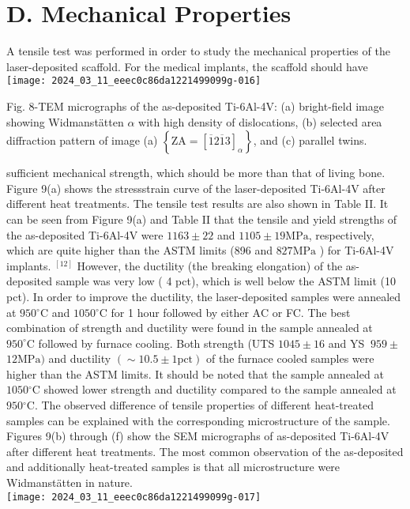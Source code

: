 \documentclass[10pt]{article}
\begin{document}
\section*{D. Mechanical Properties}
A tensile test was performed in order to study the mechanical properties of the laser-deposited scaffold. For the medical implants, the scaffold should have\\
\texttt{[image: 2024\_03\_11\_eeec0c86da1221499099g-016]}

Fig. 8-TEM micrographs of the as-deposited Ti-6Al-4V: (a) bright-field image showing Widmanstätten $\alpha$ with high density of dislocations, (b) selected area diffraction pattern of image (a) $\left\{\mathrm{ZA}=[\overline{1} 2 \overline{1} 3]_{\alpha}\right\}$, and (c) parallel twins.

sufficient mechanical strength, which should be more than that of living bone. Figure 9(a) shows the stressstrain curve of the laser-deposited Ti-6Al-4V after different heat treatments. The tensile test results are also shown in Table II. It can be seen from Figure 9(a) and Table II that the tensile and yield strengths of the as-deposited Ti-6Al-4V were $1163 \pm 22$ and $1105 \pm 19 \mathrm{MPa}$, respectively, which are quite higher than the ASTM limits (896 and $827 \mathrm{MPa}$ ) for Ti-6Al-4V implants. ${ }^{[12]}$ However, the ductility (the breaking elongation) of the as-deposited sample was very low ( 4 pct), which is well below the ASTM limit (10 pct). In order to improve the ductility, the laser-deposited samples were annealed at $950{ }^{\circ} \mathrm{C}$ and $1050{ }^{\circ} \mathrm{C}$ for 1 hour followed by either $\mathrm{AC}$ or FC. The best combination of strength and ductility were found in the sample annealed at $950^{\circ} \mathrm{C}$ followed by furnace cooling. Both strength (UTS $1045 \pm 16$ and YS $~ 959 \pm$ $12 \mathrm{MPa})$ and ductility $(\sim 10.5 \pm 1 \mathrm{pct})$ of the furnace cooled samples were higher than the ASTM limits. It should be noted that the sample annealed at $1050{ }^{\circ} \mathrm{C}$ showed lower strength and ductility compared to the sample annealed at $950{ }^{\circ} \mathrm{C}$. The observed difference of tensile properties of different heat-treated samples can be explained with the corresponding microstructure of the sample. Figures 9(b) through (f) show the SEM micrographs of as-deposited Ti-6Al-4V after different heat treatments. The most common observation of the as-deposited and additionally heat-treated samples is that all microstructure were Widmanstätten in nature.\\
\texttt{[image: 2024\_03\_11\_eeec0c86da1221499099g-017]}
\end{document}
